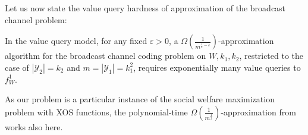 Let us now state the value query hardness of approximation of the broadcast channel problem:
\begin{theorem}
  \label{theo:VQhardnessBC}
  In the value query model, for any fixed $\varepsilon > 0$, a $\Omega\left(\frac{1}{m^{\frac{1}{2}-\varepsilon}}\right)$-approximation algorithm for the broadcast channel coding problem on $W,k_1,k_2$, restricted to the case of $|\mathcal{Y}_2| = k_2$ and $m = |\mathcal{Y}_1| = k_1^2$, requires exponentially many value queries to $f_W^1$.
\end{theorem}

\begin{rk}
  As our problem is a particular instance of the social welfare maximization problem with \textrm{XOS} functions, the polynomial-time $\Omega\left(\frac{1}{m^{\frac{1}{2}}}\right)$-approximation from~\cite{DS06} works also here.
\end{rk}


